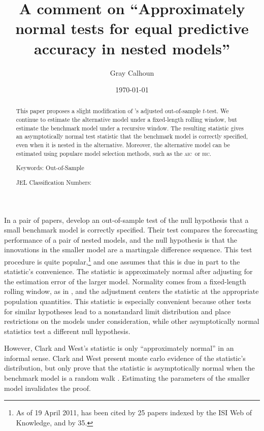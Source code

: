 \documentclass[12pt]{article}
\newcommand\possessivecite[1]{\citeauthor{#1}'s \citeyearpar{#1}}
\newcommand{\aic}{\textsc{aic}}
\newcommand{\bic}{\textsc{bic}}
\begin{document}
\author{Gray Calhoun}
\title{A comment on ``Approximately normal tests for equal predictive
  accuracy in nested models''}
\date{\today}
\maketitle

\begin{abstract} 
  \noindent This paper proposes a slight modification of
  \possessivecite{ClW:07} adjusted out-of-sample $t$-test. We continue
  to estimate the alternative model under a fixed-length rolling
  window, but estimate the benchmark model under a recursive
  window. The resulting statistic gives an asymptotically normal test
  statistic that the benchmark model is correctly specified, even when
  it is nested in the alternative.  Moreover, the alternative model
  can be estimated using populare model selection methods, such as the
  \aic\ or \bic.

\strut

\noindent Keywords: Out-of-Sample

\strut

\noindent JEL Classification Numbers:

\end{abstract}

\newpage \noindent In a pair of papers, \citet{ClW:06,ClW:07} develop
an out-of-sample test of the null hypothesis that a small benchmark
model is correctly specified.  Their test compares the forecasting
performance of a pair of nested models, and the null hypothesis is
that the innovations in the smaller model are a martingale difference
sequence.  This test procedure is quite popular,\footnote{As of 19
  April 2011, \citet{ClW:06} has been cited by 25 papers indexed by
  the ISI Web of Knowledge, and \citet{ClW:07} by 35.} and one assumes
that this is due in part to the statistic's convenience.  The
statistic is approximately normal after adjusting for the estimation
error of the larger model.  Normality comes from a fixed-length
rolling window, as in \citet{GiW:06}, and the adjustment centers the
statistic at the appropriate population quantities.  This statistic is
especially convenient because other tests for similar hypotheses
\citep[see][among others]{Mcc:07,ClM:05,ClM:01,CoS:04,CoS:02,CCS:01}
lead to a nonstandard limit distribution and place restrictions on the
models under consideration, while other asymptotically normal
statistics \citep{GiW:06} test a different null hypothesis.

However, Clark and West's statistic is only ``approximately normal''
in an informal sense.  Clark and West present monte carlo evidence of
the statistic's distribution, but only prove that the statistic is
asymptotically normal when the benchmark model is a random walk
\citep{ClW:06}. Estimating the parameters of the smaller model
invalidates the proof.
\end{document}
